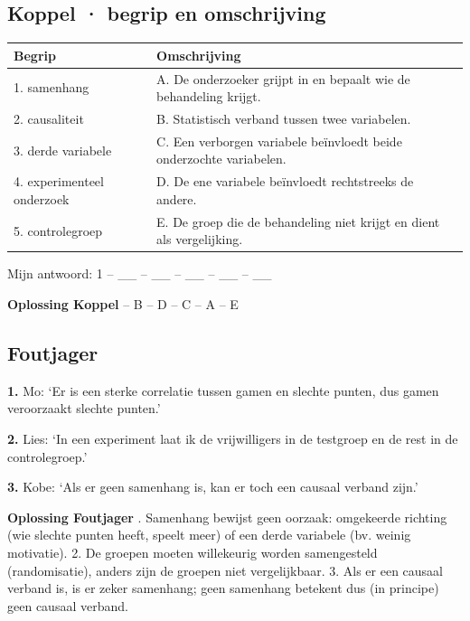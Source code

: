 \subsection*{Koppel · begrip en omschrijving}

\begin{tabular}{ll}
\hline
Begrip & Omschrijving \\
\hline
1. samenhang & A. De onderzoeker grijpt in en bepaalt wie de behandeling krijgt. \\
2. causaliteit & B. Statistisch verband tussen twee variabelen. \\
3. derde variabele & C. Een verborgen variabele beïnvloedt beide onderzochte variabelen. \\
4. experimenteel onderzoek & D. De ene variabele beïnvloedt rechtstreeks de andere. \\
5. controlegroep & E. De groep die de behandeling niet krijgt en dient als vergelijking. \\
\hline
\end{tabular}

Mijn antwoord: 1 – \_\_ – \_\_ – \_\_ – \_\_ – \_\_

\begin{oplossing}
\textbf{Oplossing Koppel}  – B  – D  – C  – A  – E
\end{oplossing}

\subsection*{Foutjager}

\textbf{1.} Mo: ‘Er is een sterke correlatie tussen gamen en slechte punten, dus gamen veroorzaakt slechte punten.’ \lijn

\textbf{2.} Lies: ‘In een experiment laat ik de vrijwilligers in de testgroep en de rest in de controlegroep.’ \lijn

\textbf{3.} Kobe: ‘Als er geen samenhang is, kan er toch een causaal verband zijn.’ \lijn

\begin{oplossing}
\textbf{Oplossing Foutjager} . Samenhang bewijst geen oorzaak: omgekeerde richting (wie slechte punten heeft, speelt meer) of een derde variabele (bv. weinig motivatie). 2. De groepen moeten willekeurig worden samengesteld (randomisatie), anders zijn de groepen niet vergelijkbaar. 3. Als er een causaal verband is, is er zeker samenhang; geen samenhang betekent dus (in principe) geen causaal verband.
\end{oplossing}

